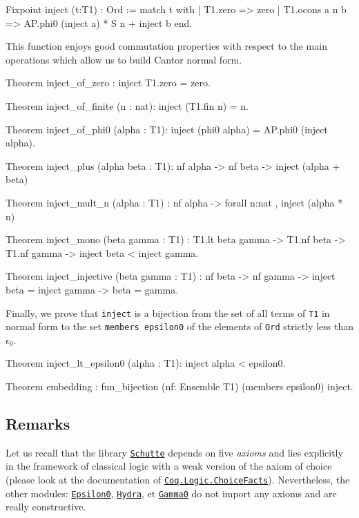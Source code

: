 \documentclass[a4paper]{book}
\begin{document}
{\begin{Coqsrc}
Fixpoint inject (t:T1) : Ord :=
 match t with 
     | T1.zero => zero
     | T1.ocons a n b =>  AP.phi0 (inject a) * S n + inject b
 end.  
\end{Coqsrc}

This function enjoys good commutation properties with respect to the main operations which
allow us to build Cantor normal form.

\begin{Coqsrc}
Theorem inject_of_zero : inject T1.zero = zero.

Theorem inject_of_finite (n : nat):
  inject (T1.fin n) =  n.

Theorem inject_of_phi0 (alpha : T1):
  inject (phi0 alpha) = AP.phi0 (inject alpha).

Theorem inject_plus (alpha beta : T1): nf alpha -> nf beta ->
  inject (alpha + beta)%

Theorem inject_mult_n (alpha : T1)  :
  nf alpha -> forall n:nat , inject (alpha *  n)%

Theorem inject_mono (beta gamma : T1) :
  T1.lt  beta gamma -> 
  T1.nf beta -> T1.nf gamma -> 
  inject beta < inject gamma.

Theorem inject_injective (beta gamma : T1) : nf beta -> nf gamma ->
  inject beta = inject gamma -> beta = gamma.
\end{Coqsrc}

Finally, we prove that \texttt{inject} is a bijection from the set of all terms of \texttt{T1} in normal form to the set 
\texttt{members epsilon0} of the elements of \texttt{Ord} strictly less than  $\epsilon_0$.

\begin{Coqsrc}
Theorem inject_lt_epsilon0 (alpha : T1):
      inject alpha < epsilon0.

Theorem embedding : 
     fun_bijection (nf: Ensemble T1)  (members epsilon0) inject.
 \end{Coqsrc}

\subsection{Remarks}
Let us recall that the library \href{../src/html/hydras.Schutte.Schutte.html}%
{\texttt{Schutte}} depends on five \emph{axioms} and lies explicitly in the  
framework of classical logic with a weak version of the axiom of choice
(please look at the documentation of
\href{https://coq.inria.fr/distrib/current/stdlib/Coq.Logic.ChoiceFacts.html}{\texttt{Coq.Logic.ChoiceFacts}}).
Nevertheless, the other modules:
\href{../src/html/hydras.Epsilon0.Epsilon0.html}%
{\texttt{Epsilon0}},
\href{../src/html/hydras.Hydra.Hydra.html}%
{\texttt{Hydra}}, et 
\href{../src/html/hydras.Gamma0.Gamma0.html}%
{\texttt{Gamma0}}
do not import any axioms and are really constructive.

}
\end{document}

